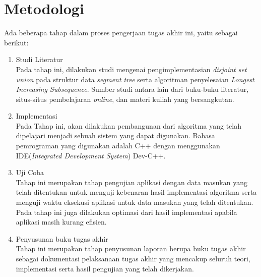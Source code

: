 \section{\quad Metodologi}
\quad Ada beberapa tahap dalam proses pengerjaan tugas akhir ini, yaitu sebagai berikut:
\begin{enumerate}
	\item Studi Literatur\\
	Pada tahap ini, dilakukan studi mengenai pengimplementasian \textit{disjoint set union} pada struktur data \textit{segment tree} serta algoritman penyelesaian \textit{Longest Increasing Subsequence}. Sumber studi antara lain dari buku-buku literatur, situs-situs pembelajaran \textit{online}, dan materi kuliah yang bersangkutan.
	\item Implementasi\\
	Pada Tahap ini, akan dilakukan pembangunan dari algoritma yang telah dipelajari menjadi sebuah sistem yang dapat digunakan. Bahasa pemrograman yang digunakan adalah C++ dengan menggunakan IDE(\textit{Integrated Development System}) Dev-C++.
	\item Uji Coba\\
	Tahap ini merupakan tahap pengujian aplikasi dengan data masukan yang telah ditentukan untuk menguji kebenaran hasil implementasi algoritma serta menguji waktu eksekusi aplikasi untuk data masukan yang telah ditentukan. Pada tahap ini juga dilakukan optimasi dari hasil implementasi apabila aplikasi masih kurang efisien.
	\item Penyusunan buku tugas akhir\\
	Tahap ini merupakan tahap penyusunan laporan berupa buku tugas akhir sebagai dokumentasi pelaksanaan tugas akhir yang mencakup seluruh teori, implementasi serta hasil pengujian yang telah dikerjakan.\\\\
\end{enumerate}

